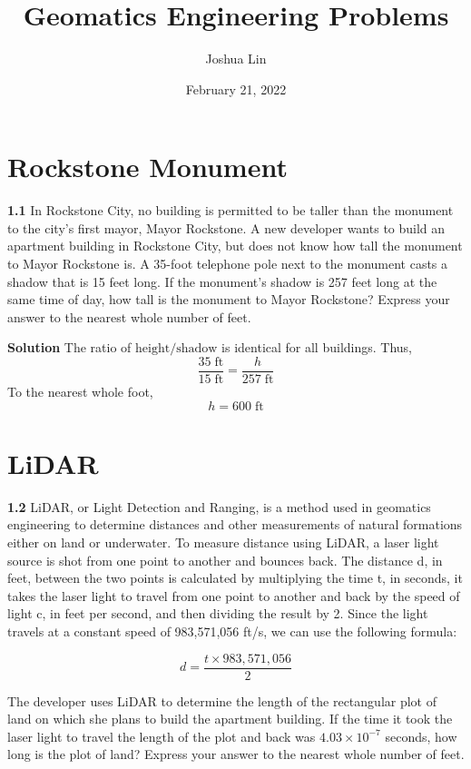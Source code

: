 \documentclass{article}
\title{Geomatics Engineering Problems}
\author{Joshua Lin}
\date{February 21, 2022}
\begin{document}
\maketitle

\section{Rockstone Monument}

\textbf{1.1} In Rockstone City, no building is permitted to be taller than the monument to the city’s first mayor, Mayor Rockstone. A new developer wants to build an apartment building in Rockstone City, but does not know how tall the monument to Mayor Rockstone is. A 35-foot telephone pole next to the monument casts a shadow that is 15 feet long. If the monument’s shadow is 257 feet long at the same time of day, how tall is the monument to Mayor Rockstone? Express your answer to the nearest whole number of feet. \bigskip

\textbf{Solution} The ratio of $\mathrm{height/shadow}$ is identical for all buildings. Thus, 
\[ \mathrm{ \frac{35 \; ft}{15 \; ft} } = \frac{h}{257 \; \mathrm{ft}} \]
To the nearest whole foot, 
\[ \boxed{ h = 600 \; \mathrm{ft} } \]

\section{LiDAR}

\textbf{1.2} LiDAR, or Light Detection and Ranging, is a method used in geomatics engineering to determine distances and other measurements of natural formations either on land or underwater. To measure distance using LiDAR, a laser light source is shot from one point to another and bounces back. The distance d, in feet, between the two points is calculated by multiplying the time t, in seconds, it takes the laser light to travel from one point to another and back by the speed of light c, in feet per second, and then dividing the result by 2. Since the light travels at a constant speed of 983,571,056 ft/s, we can use the following formula:

\[ d = \frac{t \times 983,571,056}{2} \] 

The developer uses LiDAR to determine the length of the rectangular plot of land on which she plans to build the apartment building. If the time it took the laser light to travel the length of the plot and back was $4.03 \times 10^{-7}$ seconds, how long is the plot of land? Express your answer to the nearest whole number of feet. \bigskip
\end{document}
